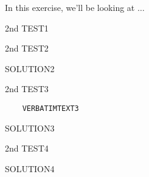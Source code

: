 \begin{intro}
  In this exercise, we'll be looking at \( \dots \)
\end{intro}
\begin{problem}
  2nd TEST1
\end{problem}
\begin{problem}
  2nd TEST2
\end{problem}
\begin{solution}
SOLUTION2
\end{solution}

\begin{problem}
  2nd TEST3
  \begin{verbatim}
    VERBATIMTEXT3
  \end{verbatim}
\begin{solution}
SOLUTION3
\end{solution}
\end{problem}
\begin{problem}
  2nd TEST4
\end{problem}
\begin{solution}
SOLUTION4
\end{solution}
